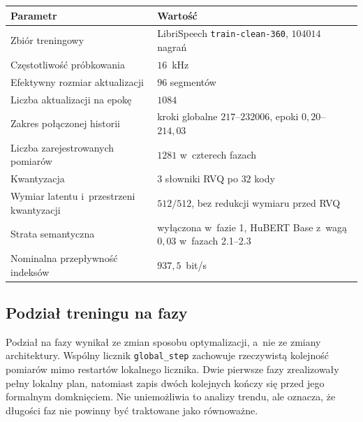 \begin{center}
\centering
\small
\begin{tabular}{>{\raggedright\arraybackslash}p{} >{\raggedright\arraybackslash}p{}}
\toprule
Parametr & Wartość \\
\midrule
Zbiór treningowy & LibriSpeech \texttt{train-clean-360}, \(104014\) nagrań \\
Częstotliwość próbkowania & \(16\)~kHz \\
Efektywny rozmiar aktualizacji & \(96\) segmentów \\
Liczba aktualizacji na epokę & \(1084\) \\
Zakres połączonej historii & kroki globalne \(217\)--\(232006\), epoki \(0{,}20\)--\(214{,}03\) \\
Liczba zarejestrowanych pomiarów & \(1281\) w~czterech fazach \\
Kwantyzacja & \(3\) słowniki RVQ po \(32\) kody \\
Wymiar latentu i~przestrzeni kwantyzacji & \(512/512\), bez redukcji wymiaru przed RVQ \\
Strata semantyczna & wyłączona w~fazie 1, HuBERT Base z~wagą \(0{,}03\) w~fazach 2.1--2.3 \\
Nominalna przepływność indeksów & \(937{,}5\)~bit/s \\
\bottomrule
\end{tabular}
\label{tab:konfiguracja-treningu-latest}
\end{center}

\subsection{Podział treningu na fazy}
\label{subsec:podzial-treningu-na-fazy}

Podział na fazy wynikał ze zmian sposobu optymalizacji, a~nie ze zmiany architektury. Wspólny licznik \texttt{global\_step} zachowuje rzeczywistą kolejność pomiarów mimo restartów lokalnego licznika. Dwie pierwsze fazy zrealizowały pełny lokalny plan, natomiast zapis dwóch kolejnych kończy się przed jego formalnym domknięciem. Nie uniemożliwia to analizy trendu, ale oznacza, że długości faz nie powinny być traktowane jako równoważne.

